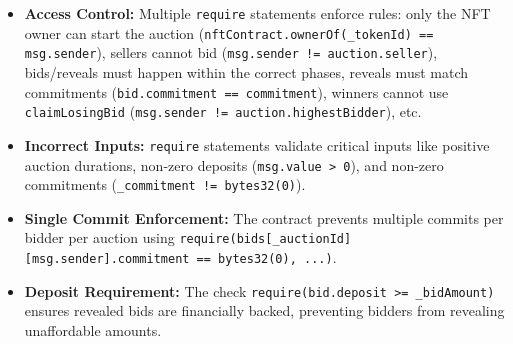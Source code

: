 \documentclass[11pt, a4paper]{article}
\begin{document}
\begin{itemize}
    \item \textbf{Access Control:} Multiple \texttt{require} statements enforce rules: only the NFT owner can start the auction (\texttt{nftContract.ownerOf(\_tokenId) == msg.sender}), sellers cannot bid (\texttt{msg.sender != auction.seller}), bids/reveals must happen within the correct phases, reveals must match commitments (\texttt{bid.commitment == commitment}), winners cannot use \texttt{claimLosingBid} (\texttt{msg.sender != auction.highestBidder}), etc.
    \item \textbf{Incorrect Inputs:} \texttt{require} statements validate critical inputs like positive auction durations, non-zero deposits (\texttt{msg.value > 0}), and non-zero commitments (\texttt{\_commitment != bytes32(0)}).
    \item \textbf{Single Commit Enforcement:} The contract prevents multiple commits per bidder per auction using \texttt{require(bids[\_auctionId][msg.sender].commitment == bytes32(0), ...)}.
    \item \textbf{Deposit Requirement:} The check \texttt{require(bid.deposit >= \_bidAmount)} ensures revealed bids are financially backed, preventing bidders from revealing unaffordable amounts.
\end{itemize}
\end{document}
